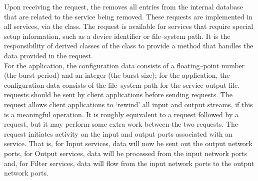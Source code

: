 Upon receiving the  request,
the  removes all entries from the internal
database that are related to the service being removed.
\secondaryEnd{}
These requests are implemented in all \mplusm{}  services, via the
 class.
The  request is available for
 services that require special setup information, such as a device
identifier or file--system path.
It is the responsibility of derived classes of the
 class to provide a method
that handles the data provided in the
 request.\\

For the  application, the configuration
data consists of a floating--point number (the burst period) and an integer (the burst
size); for the  application, the
configuration data consists of the file--system path for the service output file.\\

 requests should be sent by
client applications before sending
 requests.
The  request allows client
applications to `rewind' all input and output streams, if this is a meaningful operation.
It is roughly equivalent to a 
request followed by a  request,
but it may perform some extra work between the two requests.
The  request initiates activity
on the input and output ports associated with an  service.
That is, for Input services, data will now be sent out the output \yarp{} network ports,
for Output services, data will be processed from the input \yarp{} network ports and, for
Filter services, data will flow from the input \yarp{} network ports to the output \yarp{}
network ports.\\

